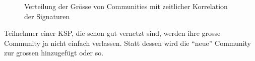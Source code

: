 \begin{figure}[t]
  \caption{Verteilung der Gr\"osse von Communities mit zeitlicher
    Korrelation der Signaturen}
  \label{fig:time-corrdist}
\end{figure}
Teilnehmer einer KSP, die schon gut vernetzt sind, werden ihre grosse
Community ja nicht einfach verlassen. Statt dessen wird die ``neue''
Community zur grossen hinzugef\"ugt oder so.

